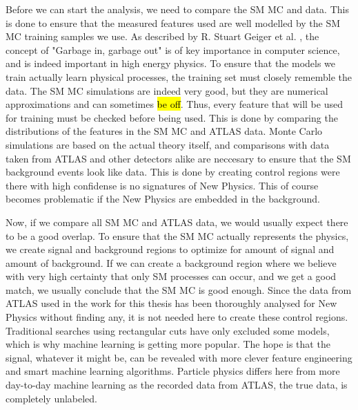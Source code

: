 Before we can start the analysis, we need to compare the SM MC and data. This is done to ensure that the measured features used 
are well modelled by the SM MC training samples we use. As described by R. Stuart Geiger et al. \cite{DBLP:journals/corr/abs-2107-02278}, the concept of "Garbage 
in, garbage out" is of key importance in computer science, and is indeed important in high energy physics. To ensure that the models 
we train actually learn physical processes, the training set must closely rememble the data. The SM MC simulations are indeed very good, 
but they are numerical approximations and can 
sometimes \hl{be off}. Thus, every feature that will be used for training must be checked before being used. This is done by 
comparing the distributions of the features in the SM MC and ATLAS data. Monte Carlo simulations are based on the actual theory 
itself, and comparisons with data taken from ATLAS and other detectors alike are neccesary to ensure that the SM background 
events look like data. This is done by creating control regions were there with high confidense is no signatures of New Physics. 
This of course becomes problematic if the New Physics are embedded in the background.\par
Now, if we compare all SM MC and ATLAS data, we would usually expect there to be a good overlap. To ensure that the SM MC actually 
represents the physics, we create signal and background regions to optimize for amount of signal and amount of background. If we can 
create a background region where we believe with very high certainty that only SM processes can occur, and we get a good match, 
we usually conclude that the SM MC is good enough. Since the data from ATLAS used in the work for this thesis has been thoroughly 
analysed for New Physics without finding any, it is not needed here to create these control regions. Traditional searches using 
rectangular cuts have only excluded some models, which is why machine learning is getting more popular. The hope is that the signal, 
whatever it might be, can be revealed with more clever feature engineering and smart machine learning algorithms. 
Particle physics differs here from more day-to-day machine learning as the recorded data from ATLAS, the true data, is completely 
unlabeled. 


